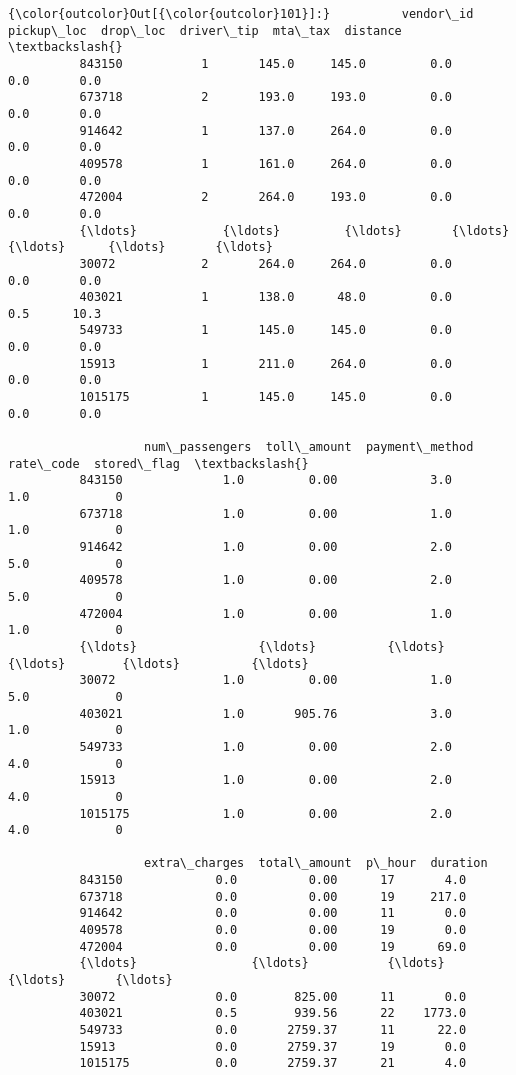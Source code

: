 \documentclass[11pt]{article}
\begin{document}
\begin{Verbatim}[commandchars=\\\{\}]
{\color{outcolor}Out[{\color{outcolor}101}]:}          vendor\_id  pickup\_loc  drop\_loc  driver\_tip  mta\_tax  distance  \textbackslash{}
          843150           1       145.0     145.0         0.0      0.0       0.0   
          673718           2       193.0     193.0         0.0      0.0       0.0   
          914642           1       137.0     264.0         0.0      0.0       0.0   
          409578           1       161.0     264.0         0.0      0.0       0.0   
          472004           2       264.0     193.0         0.0      0.0       0.0   
          {\ldots}            {\ldots}         {\ldots}       {\ldots}         {\ldots}      {\ldots}       {\ldots}   
          30072            2       264.0     264.0         0.0      0.0       0.0   
          403021           1       138.0      48.0         0.0      0.5      10.3   
          549733           1       145.0     145.0         0.0      0.0       0.0   
          15913            1       211.0     264.0         0.0      0.0       0.0   
          1015175          1       145.0     145.0         0.0      0.0       0.0   
          
                   num\_passengers  toll\_amount  payment\_method  rate\_code  stored\_flag  \textbackslash{}
          843150              1.0         0.00             3.0        1.0            0   
          673718              1.0         0.00             1.0        1.0            0   
          914642              1.0         0.00             2.0        5.0            0   
          409578              1.0         0.00             2.0        5.0            0   
          472004              1.0         0.00             1.0        1.0            0   
          {\ldots}                 {\ldots}          {\ldots}             {\ldots}        {\ldots}          {\ldots}   
          30072               1.0         0.00             1.0        5.0            0   
          403021              1.0       905.76             3.0        1.0            0   
          549733              1.0         0.00             2.0        4.0            0   
          15913               1.0         0.00             2.0        4.0            0   
          1015175             1.0         0.00             2.0        4.0            0   
          
                   extra\_charges  total\_amount  p\_hour  duration  
          843150             0.0          0.00      17       4.0  
          673718             0.0          0.00      19     217.0  
          914642             0.0          0.00      11       0.0  
          409578             0.0          0.00      19       0.0  
          472004             0.0          0.00      19      69.0  
          {\ldots}                {\ldots}           {\ldots}     {\ldots}       {\ldots}  
          30072              0.0        825.00      11       0.0  
          403021             0.5        939.56      22    1773.0  
          549733             0.0       2759.37      11      22.0  
          15913              0.0       2759.37      19       0.0  
          1015175            0.0       2759.37      21       4.0  
          

\end{Verbatim}
\end{document}
